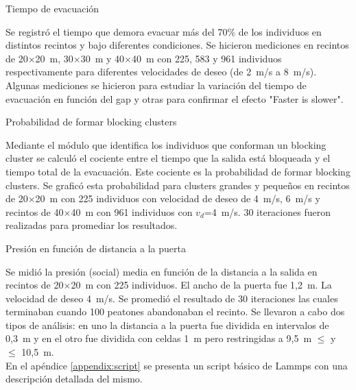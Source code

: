 {\Large Tiempo de evacuación}

Se registró el tiempo que demora evacuar más del 70\% de los individuos en distintos recintos y bajo diferentes condiciones. Se hicieron mediciones en recintos de 20$\times$20~m, 30$\times$30~m y 40$\times$40~m con 225, 583 y 961 individuos respectivamente para diferentes velocidades de deseo (de 2~m/s a 8~m/s). Algunas mediciones se hicieron para estudiar la variación del tiempo de evacuación en función del gap y otras para confirmar el efecto "Faster is slower". 

{\Large Probabilidad de formar blocking clusters}

Mediante el módulo que identifica los individuos que conforman un blocking cluster se calculó el cociente entre el tiempo que la salida está bloqueada y el tiempo total de la evacuación. Este cociente es la probabilidad de formar blocking clusters. Se graficó esta probabilidad para clusters grandes y pequeños en recintos de 20$\times$20~m con 225 individuos con velocidad de deseo de 4~m/s, 6~m/s y recintos de 40$\times$40~m con 961 individuos con $v_d$=4~m/s. 30 iteraciones fueron realizadas para promediar los resultados. 

{\Large Presión en función de distancia a la puerta}

Se midió la presión (social) media en función de la distancia a la salida en recintos de 20$\times$20~m con 225 individuos. El ancho de la puerta fue 1,2~m. La velocidad de deseo 4~m/s. Se promedió el resultado de 30 iteraciones las cuales terminaban cuando 100 peatones abandonaban el recinto. Se llevaron a cabo dos tipos de análisis: en uno la distancia a la puerta fue dividida en intervalos de 0,3~m y en el otro fue dividida con celdas 1~m pero restringidas a 9,5~m $\le$ y $\le$ 10,5~m. \\

En el apéndice \ref{appendix:script} se presenta un script básico de Lammps con una descripción detallada del mismo. 



